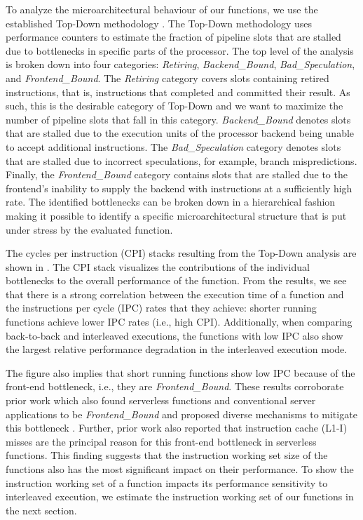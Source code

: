 To analyze the microarchitectural behaviour of our functions, we use the established Top-Down methodology \cite{yasin14_top_down}. The Top-Down methodology uses performance counters to estimate the fraction of pipeline slots that are stalled due to bottlenecks in specific parts of the processor. The top level of the analysis is broken down into four categories: \emph{Retiring}, \emph{Backend\_Bound}, \emph{Bad\_Speculation}, and \emph{Frontend\_Bound}. The \emph{Retiring} category covers slots containing retired instructions, that is, instructions that completed and committed their result. As such, this is the desirable category of Top-Down and we want to maximize the number of pipeline slots that fall in this category. \emph{Backend\_Bound} denotes slots that are stalled due to the execution units of the processor backend being unable to accept additional instructions. The \emph{Bad\_Speculation} category denotes slots that are stalled due to incorrect speculations, for example, branch mispredictions. Finally, the \emph{Frontend\_Bound} category contains slots that are stalled due to the frontend's inability to supply the backend with instructions at a sufficiently high rate. The identified bottlenecks can be broken down in a hierarchical fashion making it possible to identify a specific microarchitectural structure that is put under stress by the evaluated function.


The cycles per instruction (CPI) stacks resulting from the Top-Down analysis are shown in . The CPI stack visualizes the contributions of the individual bottlenecks to the overall performance of the function. From the results, we see that there is a strong correlation between the execution time of a function and the instructions per cycle (IPC) rates that they achieve: shorter running functions achieve lower IPC rates (i.e., high CPI). Additionally, when comparing back-to-back and interleaved executions, the functions with low IPC also show the largest relative performance degradation in the interleaved execution mode. 

The figure also implies that short running functions show low IPC because of the front-end bottleneck, i.e., they are \emph{Frontend\_Bound}. These results corroborate prior work which also found serverless functions and conventional server applications to be \emph{Frontend\_Bound} and proposed diverse mechanisms to mitigate this bottleneck \cite{btbx-pact, btbx-cal, twig, shotgun, boomerang, lukewarm_serverless}. Further, prior work \cite{lukewarm_serverless} also reported that instruction cache (L1-I) misses are the principal reason for this front-end bottleneck in serverless functions. This finding suggests that the instruction working set size of the functions also has the most significant impact on their performance. To show the instruction working set of a function impacts its performance sensitivity to interleaved execution, we estimate the instruction working set of our functions in the next section.


